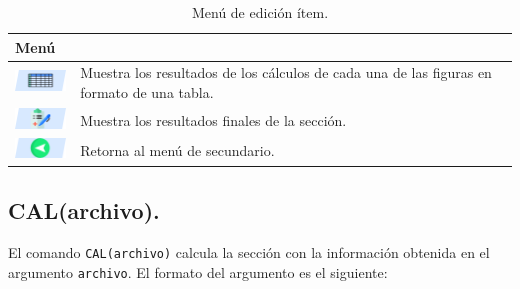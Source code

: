 \documentclass[spanish,xcolor=pdftex,dvipsnames,table,mathserif]{scrartcl}
\begin{document}
\begin{table}[H]
	\caption{Menú de edición ítem.}
	\label{tab:menuResultados}
	\begin{tabular}{>{\centering}m{2cm}>{\raggedright}m{14cm}}
		\toprule 
		\textbf{Menú} & \multicolumn{1}{c}{\textbf{Descripción}} \tabularnewline
		\midrule 
		\includegraphics{imagenes/men_tabla}
		& Muestra los resultados de los cálculos de cada una de las figuras en formato de una tabla.\tabularnewline
		\cmidrule(lr){1-2}
		\includegraphics{imagenes/men_resultados} & Muestra los resultados finales de la sección.\tabularnewline
		\cmidrule(lr){1-2}
		\includegraphics{imagenes/men_volver}& Retorna al menú de secundario.\tabularnewline
		\bottomrule
	\end{tabular}
\end{table}
\subsection{CAL(archivo).}
El comando \verb|CAL(archivo)| calcula la sección con la información obtenida en el argumento \verb|archivo|. El formato del argumento es el siguiente:
\end{document}
